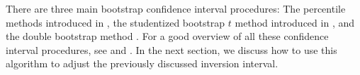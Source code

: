 \documentclass{article}\usepackage[]{graphicx}\usepackage[]{color}
\begin{document}
There are three main bootstrap confidence interval procedures: The percentile methods introduced in \citet{efron-bootstrap-1979}, the studentized bootstrap $t$ method introduced in \citet{efron-jackknife-1982}, and the double bootstrap method \citep{hall-bootstrap-1986}. For a good overview of all these confidence interval procedures, see \citet[chap. 5]{hinkley-bootstrap-1997} and \citet[chap. 11]{boos-essential-2013}. In the next section, we discuss how to use this algorithm to adjust the previously discussed inversion interval.


% 
% 
% 
\end{document}
